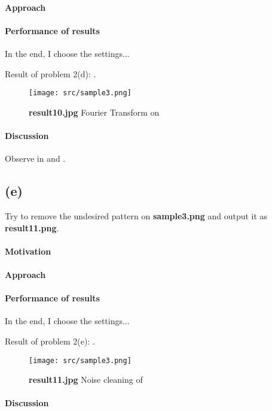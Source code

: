 \paragraph{Approach}

\paragraph{Performance of results}
In the end, I choose the \alert{settings}...

Result of problem 2(d): .
\begin{figure}
    \centering
    \texttt{[image: src/sample3.png]}
    \caption{\textbf{result10.jpg} Fourier Transform on }
    \label{result10}
\end{figure}

\paragraph{Discussion}
Observe in  and .

\subsection{(e)}\label{2_e}
Try to remove the undesired pattern on \textbf{sample3.png} and output it as \textbf{result11.png}.

\paragraph{Motivation}

\paragraph{Approach}

\paragraph{Performance of results}
In the end, I choose the \alert{settings}...

Result of problem 2(e): .
\begin{figure}
    \centering
    \texttt{[image: src/sample3.png]}
    \caption{\textbf{result11.jpg} Noise cleaning of }
    \label{result11}
\end{figure}

\paragraph{Discussion}
